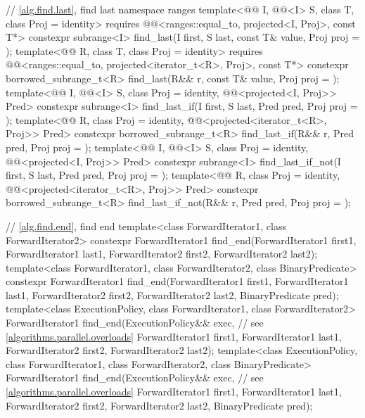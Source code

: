 \begin{codeblock}
{  // \ref{alg.find.last}, find last
  namespace ranges {
    template<@@ I, @@<I> S, class T, class Proj = identity>
      requires @@<ranges::equal_to, projected<I, Proj>, const T*>
      constexpr subrange<I> find_last(I first, S last, const T& value, Proj proj = {});
    template<@@ R, class T, class Proj = identity>
      requires
        @@<ranges::equal_to, projected<iterator_t<R>, Proj>, const T*>
      constexpr borrowed_subrange_t<R> find_last(R&& r, const T& value, Proj proj = {});
    template<@@ I, @@<I> S, class Proj = identity,
             @@<projected<I, Proj>> Pred>
      constexpr subrange<I> find_last_if(I first, S last, Pred pred, Proj proj = {});
    template<@@ R, class Proj = identity,
             @@<projected<iterator_t<R>, Proj>> Pred>
      constexpr borrowed_subrange_t<R> find_last_if(R&& r, Pred pred, Proj proj = {});
    template<@@ I, @@<I> S, class Proj = identity,
             @@<projected<I, Proj>> Pred>
      constexpr subrange<I> find_last_if_not(I first, S last, Pred pred, Proj proj = {});
    template<@@ R, class Proj = identity,
             @@<projected<iterator_t<R>, Proj>> Pred>
      constexpr borrowed_subrange_t<R> find_last_if_not(R&& r, Pred pred, Proj proj = {});
  }

  // \ref{alg.find.end}, find end
  template<class ForwardIterator1, class ForwardIterator2>
    constexpr ForwardIterator1
      find_end(ForwardIterator1 first1, ForwardIterator1 last1,
               ForwardIterator2 first2, ForwardIterator2 last2);
  template<class ForwardIterator1, class ForwardIterator2, class BinaryPredicate>
    constexpr ForwardIterator1
      find_end(ForwardIterator1 first1, ForwardIterator1 last1,
               ForwardIterator2 first2, ForwardIterator2 last2,
               BinaryPredicate pred);
  template<class ExecutionPolicy, class ForwardIterator1, class ForwardIterator2>
    ForwardIterator1
      find_end(ExecutionPolicy&& exec,                          // see \ref{algorithms.parallel.overloads}
               ForwardIterator1 first1, ForwardIterator1 last1,
               ForwardIterator2 first2, ForwardIterator2 last2);
  template<class ExecutionPolicy, class ForwardIterator1,
           class ForwardIterator2, class BinaryPredicate>
    ForwardIterator1
      find_end(ExecutionPolicy&& exec,                          // see \ref{algorithms.parallel.overloads}
               ForwardIterator1 first1, ForwardIterator1 last1,
               ForwardIterator2 first2, ForwardIterator2 last2,
               BinaryPredicate pred);

}
\end{codeblock}
